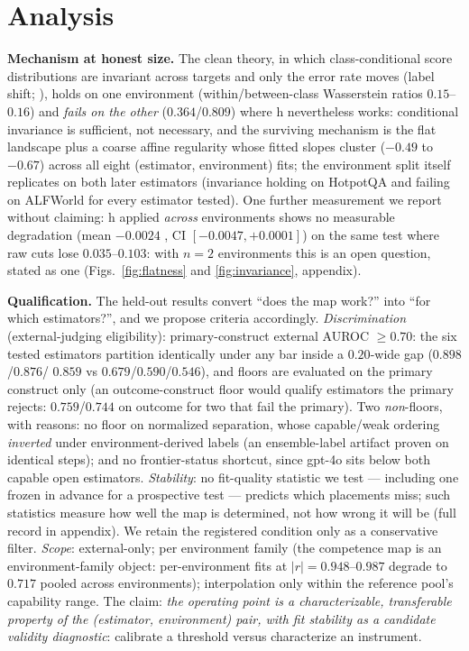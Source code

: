 \documentclass{article}
\newcommand{\ba}{\text{BA}}
\begin{document}
\section{Analysis}\label{sec:analysis}
\textbf{Mechanism at honest size.} The clean theory, in which class-conditional score
distributions are invariant across targets and only the error rate moves
(label shift; \citealp{lipton2018detecting,saerens2002adjusting}), holds on one
environment (within/between-class Wasserstein ratios $0.15$--$0.16$) and
\emph{fails on the other} ($0.364$/$0.809$) where h nevertheless works:
conditional invariance is sufficient, not necessary, and the surviving
mechanism is the flat landscape plus a coarse affine regularity whose fitted
slopes cluster ($-0.49$ to $-0.67$) across all eight (estimator, environment)
fits; the environment split itself replicates on both later estimators
(invariance holding on HotpotQA and failing on ALFWorld for every estimator
tested). One further measurement we report without claiming: h applied \emph{across}
environments shows no measurable degradation
(mean $-0.0024$ \ba, CI $[-0.0047, +0.0001]$) on the same test where raw cuts
lose $0.035$--$0.103$: with $n{=}2$ environments this is an open question,
stated as one (Figs.~\ref{fig:flatness} and \ref{fig:invariance}, appendix).

\textbf{Qualification.} The held-out results convert ``does the map work?''
into ``for which estimators?'', and we propose criteria accordingly.
\emph{Discrimination} (external-judging eligibility):
primary-construct external AUROC $\geq 0.70$: the six tested estimators
partition identically under any bar inside a $0.20$-wide gap ($0.898$/$0.876$/
$0.859$ vs $0.679$/$0.590$/$0.546$), and floors are evaluated on the primary
construct only (an outcome-construct floor would qualify estimators the
primary rejects: $0.759$/$0.744$ on outcome for two that fail the primary).
Two \emph{non}-floors, with reasons: no floor on normalized separation, whose
capable/weak ordering \emph{inverted} under environment-derived labels (an
ensemble-label artifact proven on identical steps); and no frontier-status
shortcut, since gpt-4o sits below both capable open estimators.
\emph{Stability}: no fit-quality statistic we test --- including one frozen
in advance for a prospective test --- predicts which placements miss; such
statistics measure how well the map is determined, not how wrong it will be
(full record in appendix). We retain the registered condition only as a
conservative filter. \emph{Scope}:
external-only; per environment family (the competence map is an
environment-family object: per-environment fits at $|r| = 0.948$--$0.987$
degrade to $0.717$ pooled across environments); interpolation only within the
reference pool's capability range. The claim: \emph{the operating point is a
characterizable, transferable property of the (estimator, environment) pair,
with fit stability as a candidate validity diagnostic}: calibrate a
threshold \citep{han2024uala} versus characterize an instrument.
\end{document}
